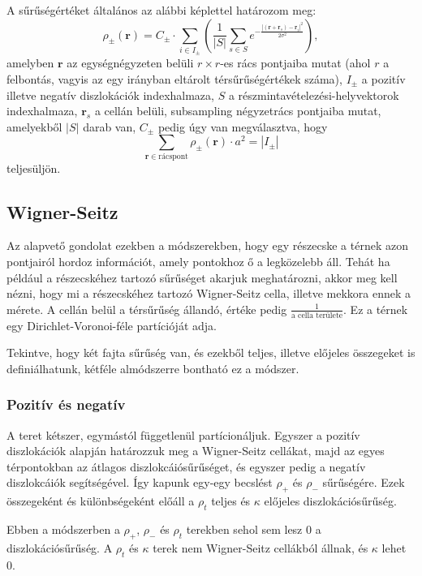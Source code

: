 \documentclass[10pt,a4paper]{scrartcl}
\let\mathbf\bm
\begin{document}
A sűrűségértéket általános az alábbi képlettel határozom meg:
\[{\rho _ \pm }\left( {\mathbf{r}} \right) = {C_ \pm } \cdot \sum\limits_{i \in {I_ \pm }} {\left( {\frac{1}{{\left| S \right|}}\sum\limits_{s \in S} {{e^{ - \frac{{{{\left| {\left( {{\mathbf{r}} + {{\mathbf{r}}_s}} \right) - {{\mathbf{r}}_i}} \right|}^2}}}{{2{\sigma ^2}}}}}} } \right)} ,\]
amelyben ${\mathbf{r}}$ az egységnégyzeten belüli $r\times r$-es rács pontjaiba mutat (ahol $r$ a felbontás, vagyis az egy irányban eltárolt térsűrűségértékek száma), $I_\pm$ a pozitív illetve negatív diszlokációk indexhalmaza, $S$ a részmintavételezési-helyvektorok indexhalmaza, ${{\mathbf{r}}_s}$ a cellán belüli, subsampling négyzetrács pontjaiba mutat, amelyekből ${\left| S \right|}$ darab van, ${C_ \pm }$ pedig úgy van megválasztva, hogy \[\sum\limits_{{\mathbf{r}} \in {\text{rácspont}}} {{\rho _ \pm }\left( {\mathbf{r}} \right) \cdot {a^2}}  = \left| {{I_ \pm }} \right|\]
teljesüljön.

\subsection{Wigner-Seitz}
Az alapvető gondolat ezekben a módszerekben, hogy egy részecske a térnek azon pontjairól hordoz információt, amely pontokhoz ő a legközelebb áll. Tehát ha például a részecskéhez tartozó sűrűséget akarjuk meghatározni, akkor meg kell nézni, hogy mi a részecskéhez tartozó Wigner-Seitz cella, illetve mekkora ennek a mérete. A cellán belül a térsűrűség állandó, értéke pedig $\frac{1}{\text{a cella területe}}$. Ez a térnek egy Dirichlet-Voronoi-féle partícióját adja.

Tekintve, hogy két fajta sűrűség van, és ezekből teljes, illetve előjeles összegeket is definiálhatunk, kétféle almódszerre bontható ez a módszer.

\subsubsection{Pozitív és negatív}
A teret kétszer, egymástól függetlenül partícionáljuk. Egyszer a pozitív diszlokációk alapján határozzuk meg a Wigner-Seitz cellákat, majd az egyes térpontokban az átlagos diszlokcáiósűrűséget, és egyszer pedig a negatív diszlokcáiók segítségével. Így kapunk egy-egy becslést $\rho_+$ és $\rho_-$ sűrűségére. Ezek összegeként és különbségeként előáll a $\rho_t$ teljes és $\kappa$ előjeles diszlokációsűrűség.

Ebben a módszerben a $\rho_+$, $\rho_-$ és $\rho_t$ terekben sehol sem lesz 0 a diszlokációsűrűség. A $\rho_t$ és $\kappa$ terek nem Wigner-Seitz cellákból állnak, és $\kappa$ lehet 0.
\end{document}
